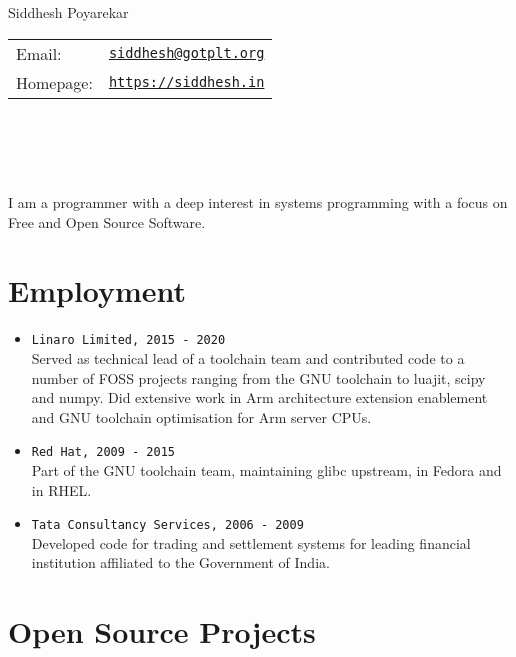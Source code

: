 \documentclass[letterpaper]{article}
\def\name{Siddhesh Poyarekar}
\begin{document}
{\huge \name}


\begin{minipage}{0.45\linewidth}
  \begin{tabular}{ll}
    Email: & \href{mailto:siddhesh@gotplt.org}{\tt siddhesh@gotplt.org} \\
    Homepage: & \href{https://siddhesh.in}{\tt https://siddhesh.in} \\
  \end{tabular}
\end{minipage}
\\ \\ \\ \\
I am a programmer with a deep interest in systems programming with a focus on Free and Open Source Software.

\section*{Employment}

\begin{itemize}
	\item {\tt Linaro Limited, 2015 - 2020}\\
		Served as technical lead of a toolchain team and contributed
		code to a number of FOSS projects ranging from the GNU
		toolchain to luajit, scipy and numpy.  Did extensive work in
		Arm architecture extension enablement and GNU toolchain
		optimisation for Arm server CPUs.
	\item {\tt Red Hat, 2009 - 2015}\\
		Part of the GNU toolchain team, maintaining glibc upstream, in
		Fedora and in RHEL.
	\item {\tt Tata Consultancy Services, 2006 - 2009}\\
		Developed code for trading and settlement systems for leading
		financial institution affiliated to the Government of India.
\end{itemize}

\section*{Open Source Projects}
\end{document}
